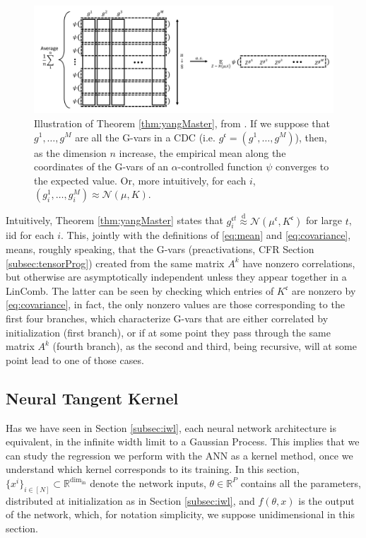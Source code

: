 \documentclass[11pt,notitlepage]{article}
\numberwithin{equation}{section}
\def\R{{\mathbb{R}}}
\def\normdist{\mathcal{N}}
\theoremstyle{remark}
\theoremstyle{definition}
\begin{document}
	\begin{figure}[h!]
		\centering
		\includegraphics[width=\linewidth]{Figures/NETSOR_master_thm1.png}
		\caption{Illustration of Theorem \ref{thm:yangMaster}, from \cite{yang2019tensor}. If we suppose that $g^1, \dots, g^M$ are all the G-vars in a CDC (i.e. $g^{\mathfrak{c}} = (g^1, \dots, g^M)$), then, as the dimension $n$ increase, the empirical mean along the coordinates of the G-vars of an $\alpha$-controlled function $\psi$ converges to the expected value.
			Or, more intuitively, for each $i$, $(g^1_i, \dots, g^M_i) \approx \normdist(\mu, K)$.
		}
	\end{figure} 
	
	Intuitively, Theorem \ref{thm:yangMaster} states that $g_i^{\mathfrak{c}t} \stackrel{\text{d}}{\approx} \normdist(\mu^\mathfrak{c}, K^\mathfrak{c})$ for large $t$, iid for each $i$.
	This, jointly with the definitions of \eqref{eq:mean} and \eqref{eq:covariance}, means, roughly speaking, that the G-vars (preactivations, CFR Section \ref{subsec:tensorProg}) created from the same matrix $A^k$ have nonzero correlations, but otherwise are asymptotically independent unless they appear together in a LinComb.
	The latter can be seen by checking which entries of $K^\mathfrak{c}$ are nonzero by \eqref{eq:covariance}, in fact, the only nonzero values are those corresponding to the first four branches, which characterize G-vars that are either correlated by initialization (first branch), or if at some point they pass through the same matrix $A^k$ (fourth branch), as the second and third, being recursive, will at some point lead to one of those cases.
	
	\subsection{Neural Tangent Kernel}\label{subsec:ntk}
	
	Has we have seen in Section \ref{subsec:iwl}, each neural network architecture is equivalent, in the infinite width limit to a Gaussian Process.
	This implies that we can study the regression we perform with the ANN as a kernel method, once we understand which kernel corresponds to its training.
	In this section, $\{x^i\}_{i\in [N]} \subset \R^{\text{dim}_\text{in}}$ denote the network inputs, $\theta \in \R^P$ contains all the parameters, distributed at initialization as in Section \ref{subsec:iwl}, and $f(\theta, x)$ is the output of the network, which, for notation simplicity, we suppose unidimensional in this section.
	
\end{document}

